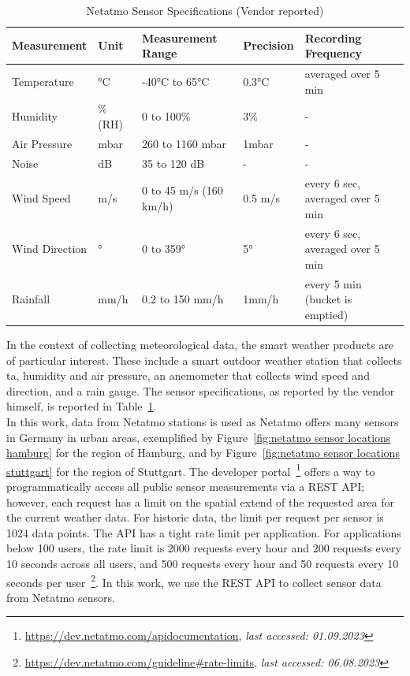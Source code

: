 \begin{table}[]
\begin{tabular}{@{}lllll@{}}
\toprule
Measurement    & Unit    & Measurement Range      & Precision  & Recording Frequency              \\ \midrule
Temperature    & °C      & -40°C to 65°C          & 0.3°C   & averaged over 5 min              \\
Humidity       & \% (RH) & 0 to 100\%             & 3\%     & -                                \\
Air Pressure   & mbar    & 260 to 1160 mbar       & 1mbar   & -                                \\
Noise          & dB      & 35 to 120 dB           & -       & -                                \\
Wind Speed     & m/s     & 0 to 45 m/s (160 km/h) & 0.5 m/s & every 6 sec, averaged over 5 min \\
Wind Direction & °       & 0 to 359°              & 5°      & every 6 sec, averaged over 5 min \\
Rainfall       & mm/h    & 0.2 to 150 mm/h        & 1mm/h   & every 5 min (bucket is emptied)  \\ \bottomrule
\end{tabular}
\caption{Netatmo Sensor Specifications (Vendor reported)}
\label{tab: netatmo sensor specs}
\end{table}

In the context of collecting meteorological data, the smart weather products are of particular interest. These include a smart outdoor weather station that collects \gls{ta}, humidity and air pressure, an anemometer that collects wind speed and direction, and a rain gauge. The sensor specifications, as reported by the vendor himself, is reported in Table~\ref{tab: netatmo sensor specs}.\\
In this work, data from Netatmo stations is used as Netatmo offers many sensors in Germany in urban areas, exemplified by Figure~\ref{fig:netatmo sensor locations hamburg} for the region of Hamburg, and by Figure~\ref{fig:netatmo sensor locations stuttgart} for the region of Stuttgart.
The developer portal~\footnote{\url{https://dev.netatmo.com/apidocumentation}, \textit{last accessed: 01.09.2023}} offers a way to programmatically access all public sensor measurements via a REST API; however, each request has a limit on the spatial extend of the requested area for the current weather data. For historic data, the limit per request per sensor is 1024 data points. The API has a tight rate limit per application. For applications below 100 users, the rate limit is 2000 requests every hour and 200 requests every 10 seconds across all users, and 500 requests every hour and 50 requests every 10 seconds per user~\footnote{\url{https://dev.netatmo.com/guideline\#rate-limits}, \textit{last accessed: 06.08.2023}}. In this work, we use the REST API to collect sensor data from Netatmo sensors.

